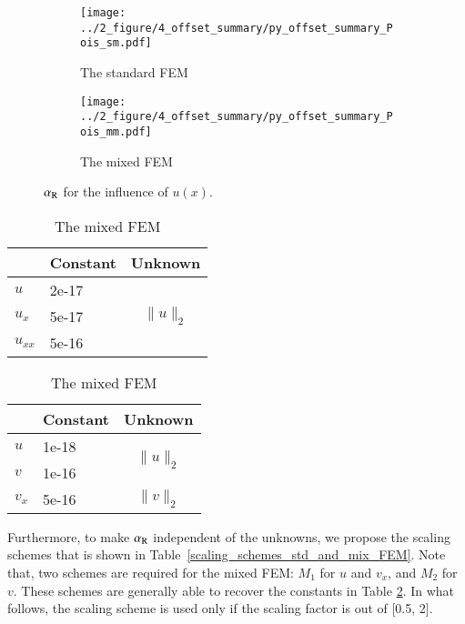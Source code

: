\documentclass[review,3p]{elsarticle}
\begin{document}
\begin{figure}[!ht]
	\centering
    \begin{subfigure}{6.0cm}
        \texttt{[image: ../2\_figure/4\_offset\_summary/py\_offset\_summary\_Pois\_sm.pdf]}
        \caption{The standard FEM}
        \label{py_offset_summary_Pois_sm}
    \end{subfigure}
    \hspace{-0.2cm}
    \begin{subfigure}{6.0cm}
        \texttt{[image: ../2\_figure/4\_offset\_summary/py\_offset\_summary\_Pois\_mm.pdf]}
        \caption{The mixed FEM}
        \label{py_offset_summary_Pois_mm}
    \end{subfigure}
\caption{$\alpha_{\rm R}$ for the influence of $u(x)$.}
\label{py_offset_summary_Pois}
\end{figure}

\newpage
\begin{table}[!ht]
\small
{}
\hspace{3.5cm}
\begin{subtable}{0.4\textwidth}
\caption{The standard FEM}
\begin{tabular}{l l c}
\hline
 & Constant & Unknown \\ \hline
$u$ & 2e-17 & \multirow{3}{*}{$\|u\|_2$} \\ \cline{1-2}
$u_x$ & 5e-17 & \\ \cline{1-2}
$u_{xx}$ & 5e-16 & \\ \hline
\end{tabular}
\end{subtable}
\hspace{-2cm}
\begin{subtable}{.4\textwidth}
\caption{The mixed FEM}
\begin{tabular}{l l c}
\hline
 & Constant & Unknown \\ \hline
$u$ & 1e-18 & \multirow{2}{*}{$\|u\|_2$} \\ \cline{1-2} 
$v$ & 1e-16 &  \\ \hline
$v_x$ & 5e-16 & $\|v\|_2$ \\ \hline
\end{tabular}
\end{subtable}
\label{relation_alpha_R_l2_norm}
\end{table}

Furthermore, to make $\alpha_{\rm R}$ independent of the unknowns, we propose the scaling schemes that is shown in Table~\ref{scaling_schemes_std_and_mix_FEM}. Note that, two schemes are required for the mixed FEM: $M_1$ for $u$ and $v_x$, and $M_2$ for $v$. These schemes are generally able to recover the constants in Table \ref{relation_alpha_R_l2_norm}. In what follows, the scaling scheme is used only if the scaling factor is out of [0.5, 2]. 
\end{document}
